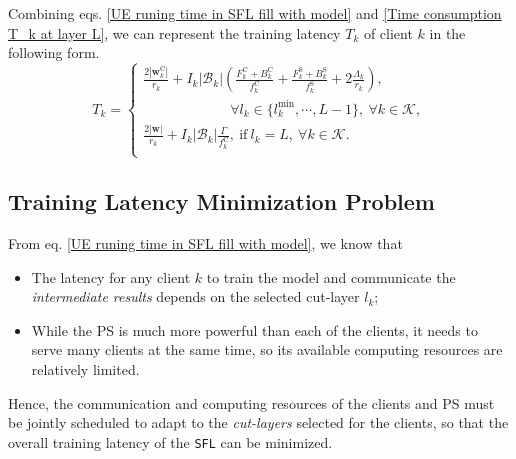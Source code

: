 \documentclass[10pt,journal,transmag]{IEEEtran}
\begin{document}
Combining eqs. \eqref{UE runing time in SFL fill with model} and \eqref{Time consumption T_k at layer L}, we can represent the training latency $T_k$ of client $k$ in the following form.
\begin{equation}
    T_k =  
    \begin{cases} 
        \displaystyle {\frac{2|\textbf{w}^\text{C}_k|}{r_k} + I_k |\mathcal{B}_k| \left( \frac{ F^\text{C}_k+B^\text{C}_k}{f_k^\text{C}} + \frac{ F^\text{S}_k+B^\text{S}_k}{f_k^\text{S}} + 2\frac{\Lambda_k}{r_k} \right)},\\ 
        \quad \quad \quad \quad \quad \quad\ \forall l_k \in \{l_k^\text{min}, \cdots, L-1\},\ \forall k \in \mathcal{K}, \\
        \displaystyle {\frac{2|\textbf{w}|}{r_k}+ I_k |\mathcal{B}_k| \frac{\Gamma}{f^\text{C}_k}},\ \text{if}\ l_k=L,\ \forall k \in \mathcal{K}.\\
    \end{cases}
    \label{original expression for T_k}
\end{equation}


\subsection{Training Latency Minimization Problem}
From eq. \eqref{UE runing time in SFL fill with model}, we know that
\begin{itemize}
    \item The latency for any client $k$ to train the model and communicate the \textit{intermediate results} depends on the selected cut-layer $l_k$;
    \item While the PS is much more powerful than each of the clients, it needs to serve many clients at the same time, so its available computing resources are relatively limited. 
\end{itemize}
Hence, the communication and computing resources of the clients and PS must be jointly scheduled to adapt to the \textit{cut-layers} selected for the clients, so that the overall training latency of the \texttt{SFL} can be minimized.
\end{document}
